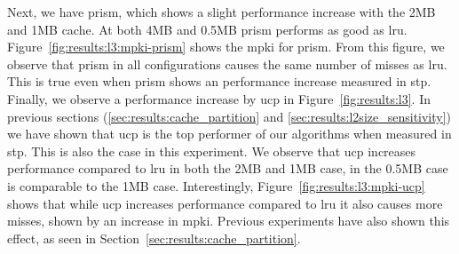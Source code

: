 Next, we have \gls{prism}, which shows a slight performance increase with the 2MB and 1MB cache. 
At both 4MB and 0.5MB \gls{prism} performs as good as \gls{lru}.
Figure~\ref{fig:results:l3:mpki-prism} shows the \gls{mpki} for \gls{prism}.
From this figure, we observe that \gls{prism} in all configurations causes the same number of misses as \gls{lru}.
This is true even when \gls{prism} shows an performance increase measured in \gls{stp}.
Finally, we observe a performance increase by \gls{ucp} in Figure~\ref{fig:results:l3}. 
In previous sections (\ref{sec:results:cache_partition} and \ref{sec:results:l2size_sensitivity}) we have shown that \gls{ucp} is the top performer of our algorithms when measured in \gls{stp}.
This is also the case in this experiment.
We observe that \gls{ucp} increases performance compared to \gls{lru} in both the 2MB and 1MB case, in the 0.5MB case is comparable to the 1MB case.
Interestingly, Figure~\ref{fig:results:l3:mpki-ucp} shows that while \gls{ucp} increases performance compared to \gls{lru} it also causes more misses, shown by an increase in \gls{mpki}.
Previous experiments have also shown this effect, as seen in Section~\ref{sec:results:cache_partition}.
